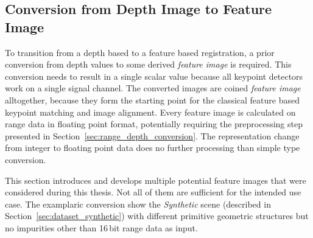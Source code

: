 \subsection{Conversion from Depth Image to Feature Image}\label{sec:feature_images}

To transition from a depth based to a feature based registration, a prior conversion from depth values to some derived \emph{feature image} is required.
This conversion needs to result in a single scalar value because all keypoint detectors work on a single signal channel.
The converted images are coined \emph{feature image} alltogether, because they form the starting point for the classical feature based keypoint matching and image alignment.
Every feature image is calculated on range data in floating point format, potentially requiring the preprocessing step presented in Section~\ref{sec:range_depth_conversion}.
The representation change from integer to floating point data does no further processing than simple type conversion.

This section introduces and develops multiple potential feature images that were considered during this thesis.
Not all of them are sufficient for the intended use case.
The examplaric conversion show the \emph{Synthetic} scene (described in Section~\ref{sec:dataset_synthetic}) with different primitive geometric structures but no impurities other than 16\,bit range data as input.






